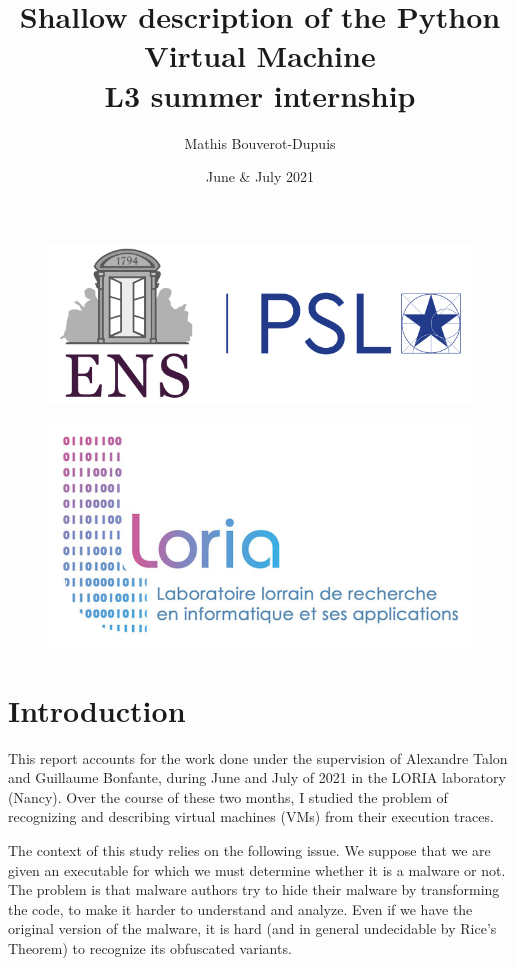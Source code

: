 \documentclass[english]{article}
\begin{document}
	
\title{Shallow description of the Python Virtual Machine \\ \large L3 summer internship}
\author{Mathis Bouverot-Dupuis}
\date{June \& July 2021}

\maketitle 

\begin{figure}[h]
	\centering 
	\includegraphics[width=.7\linewidth]{img/logoENS.png}	
\end{figure}
\begin{figure}[h]
	\centering 
	\includegraphics[width=.7\linewidth]{img/logoLORIA.jpg}
\end{figure} 

\newpage 

\tableofcontents
\newpage

\section{Introduction}
This report accounts for the work done under the supervision of Alexandre Talon and Guillaume Bonfante, during June and July of 2021 in the LORIA laboratory (Nancy). Over the course of these two months, I studied the problem of recognizing and describing virtual machines (VMs) from their execution traces.

The context of this study relies on the following issue. We suppose that we are given an executable for which we must determine whether it is a malware or not. The problem is that malware authors try to hide their malware by transforming the code, to make it harder to understand and analyze. Even if we have the original version of the malware, it is hard (and in general undecidable by Rice's Theorem) to recognize its obfuscated variants.
\end{document}
